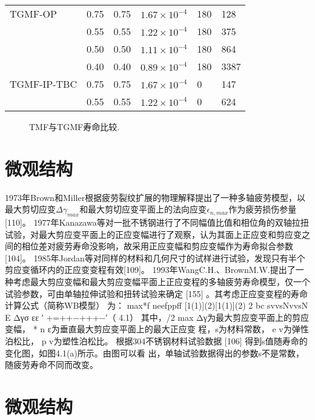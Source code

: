 \begin{table}[htbp]
\begin{tabular}{llllll}
    \midrule
    TGMF-OP & 0.75  & 0.75  & $1.67\times 10^{-4}$ & 180   & 128 \\
          & 0.55  & 0.55  & $1.22\times 10^{-4}$ & 180   & 375 \\
          & 0.50  & 0.50  & $1.11\times 10^{-4}$ & 180   & 864 \\
          & 0.40  & 0.40  & $0.89\times 10^{-4}$ & 180   & 3387 \\
    \midrule
    TGMF-IP-TBC & 0.75  & 0.75  & $1.67\times 10^{-4}$ & 0     & 147 \\
          & 0.55  & 0.55  & $1.22\times 10^{-4}$ & 0     & 624 \\
    \bottomrule
    \end{tabular}%
  \label{tab:addlabel}%
\end{table}%

\begin{figure}[!htp]
\caption{TMF与TGMF寿命比较.}
\label{Fig:plot_exp_fatigue_life}
\end{figure}



\section{微观结构}
1973年Brown和Miller根据疲劳裂纹扩展的物理解释提出了一种多轴疲劳模型，以最大剪切应变$\Delta\gamma_{max}$和最大剪切应变平面上的法向应变$\epsilon_{n,max}$作为疲劳损伤参量[110]。
1977年Kanazawa等对一批不锈钢进行了不同幅值比值和相位角的双轴拉扭试验，对最大剪应变平面上的正应变幅进行了观察，认为其面上正应变和剪应变之间的相位差对疲劳寿命没影响，故采用正应变幅和剪应变幅作为寿命拟合参数[104]。
1985年Jordan等对同样的材料和几何尺寸的试样进行试验，发现只有半个剪应变循环内的正应变变程有效[109]。
1993年WangC.H.、BrownM.W.提出了一种考虑最大剪应变幅和最大剪应变幅平面上正应变程的多轴疲劳寿命模型，仅一个试验参数，可由单轴拉伸试验和扭转试验来确定
[155]
。其考虑正应变变程的寿命计算公式（简称WB模型）
为：
max*f
neefppff
[1(1)](2)[1(1)](2)
2
bc
svvsNvvsN
E
Δγσ
εε
′
+=++−+++−′（
4.1）
其中，/2
max
Δγ为最大剪应变平面上的剪应变幅，
*
n
ε为垂直最大剪应变平面上的最大正应变
程，s为材料常数，
e
v为弹性泊松比，
p
v为塑性泊松比。
根据304不锈钢材料试验数据
[106]
得到s值随寿命的变化图，如图4.1(a)所示。由图可以看
出，单轴试验数据得出的参数s不是常数，随疲劳寿命不同而改变。

\section{微观结构}

